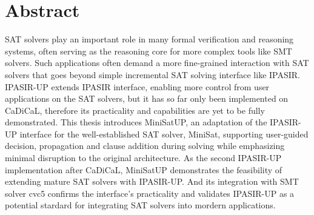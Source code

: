 \chapter*{Abstract}

SAT solvers play an important role in many formal verification and reasoning systems, often serving as the reasoning core for more complex tools like SMT solvers. Such applications often demand a more fine-grained interaction with SAT solvers that goes beyond simple incremental SAT solving interface like IPASIR. IPASIR-UP extends IPASIR interface, enabling more control from user applications on the SAT solvers, but it has so far only been implemented on CaDiCaL, therefore its practicality and capabilities are yet to be fully demonstrated. This thesis introduces MiniSatUP, an adaptation of the IPASIR-UP interface for the well-established SAT solver, MiniSat, supporting user-guided decision, propagation and clause addition during solving while emphasizing minimal disruption to the original architecture. As the second IPASIR-UP implementation after CaDiCaL, MiniSatUP demonstrates the feasibility of extending mature SAT solvers with IPASIR-UP. And its integration with SMT solver cvc5 confirms the interface's practicality and validates IPASIR-UP as a potential stardard for integrating SAT solvers into mordern applications.
